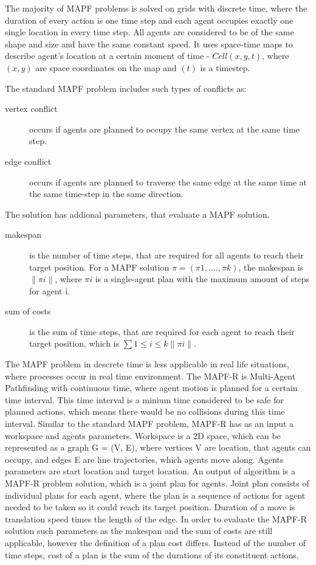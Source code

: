 \documentclass[thesis=B,english]{FITthesis}[2019/12/23]
\begin{document}
The majority of MAPF problems is solved on grids with discrete time, where the duration 
of every action is one time step and each agent occupies exactly one single location in every time step. All agents are considered to be of the same shape and size and have the same constant speed. It uses space-time maps to describe agent's location at a certain moment of time - $Cell(x, y, t)$, where $(x,y)$ are space coordinates on the map and $(t)$ is a timestep. 

The standard MAPF problem includes such types of conflicts as:
\begin{description}
\item[vertex conflict]  occurs if agents are planned to occupy the same vertex at the same time step.
\item [edge conflict]   occurs if agents are planned to traverse the same edge at the same time at the same time-step in the same direction.
\end{description}

The solution has addional parameters, that evaluate a MAPF solution.
\begin{description}
\item [makespan] is the number of time steps, that are required for all agents to reach their target position. For a MAPF solution $\pi = (\pi 1,...., \pi k)$, the makespan is $\|\pi i\|$, where $\pi i$ is a single-agent plan with the maximum amount of steps for agent i.
\item [sum of costs] is the sum of time steps, that are required for each agent to reach their target position, which is $\displaystyle\sum 1 \leq i \leq k\|\pi i\|$. 
\end{description}

The MAPF problem in descrete time is less applicable in real life situations, where processes occur in real time environment. The MAPF-R is Multi-Agent Pathfinding with continuous time, where agent motion is planned for a certain time interval. This time interval is a minium time considered to be safe for planned actions, which means there would be no collisions during this time interval. Similar to the standard MAPF problem, MAPF-R has as an input a workspace and agents parameters. Workspace is a 2D space, which can be represented as a graph G = (V, E), where vertices V are location, that agents can occupy, and edges E are line trajectories, which agents move along. Agents parameters are start location and target location. An output of algorithm is a MAPF-R problem solution, which is a joint plan for agents. Joint plan consists of individual plans for each agent, where the plan is a sequence of actions for agent needed to be taken so it could reach its target position. Duration of a move is translation speed times the length of the edge. In order to evaluate the MAPF-R solution such parameters as the makespan and the sum of costs are still applicable, however the definition of a plan cost differs. Instead of the number of time steps, cost of a plan is the sum of the durations of its constituent actions. 
\end{document}
